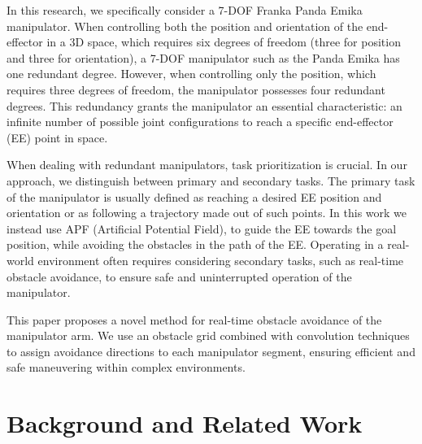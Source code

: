\documentclass[a4paper]{article}
\begin{document}
In this research, we specifically consider a 7-DOF Franka Panda Emika~\cite{Franka2021} manipulator. When controlling both the position and orientation of the end-effector in a 3D space, which requires six degrees of freedom (three for position and three for orientation), a 7-DOF manipulator such as the Panda Emika has one redundant degree. However, when controlling only the position, which requires three degrees of freedom, the manipulator possesses four redundant degrees. This redundancy grants the manipulator an essential characteristic: an infinite number of possible joint configurations to reach a specific end-effector (EE) point in space.

When dealing with redundant manipulators, task prioritization is crucial. In our approach, we distinguish between primary and secondary tasks. The primary task of the manipulator is usually defined as reaching a desired EE position and orientation or as following a trajectory made out of such points. In this work we instead use APF (Artificial Potential Field), to guide the EE towards the goal position, while avoiding the obstacles in the path of the EE. Operating in a real-world environment often requires considering secondary tasks, such as real-time obstacle avoidance, to ensure safe and uninterrupted operation of the manipulator.

This paper proposes a novel method for real-time obstacle avoidance of the manipulator arm. We use an obstacle grid combined with convolution techniques to assign avoidance directions to each manipulator segment, ensuring efficient and safe maneuvering within complex environments. 

\section{Background and Related Work}
\end{document}
